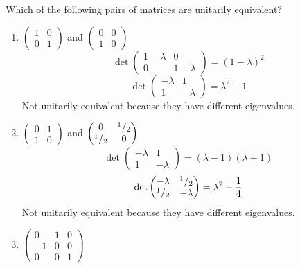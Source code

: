 Which of the following pairs of matrices are unitarily equivalent?
\begin{enumerate}
\item $\begin{pmatrix} 1& 0\\0 & 1\end{pmatrix}$ and $\begin{pmatrix}0
    & 0\\1 & 0\end{pmatrix}$
\begin{equation}
\det{\begin{pmatrix} 1-\lambda& 0\\0 & 1-\lambda\end{pmatrix}} = (1-\lambda)^2
\end{equation}
\begin{equation}
\det{\begin{pmatrix}-\lambda & 1\\1 & -\lambda\end{pmatrix}} =
\lambda^2 -1
\end{equation}
Not unitarily equivalent  because they have different eigenvalues.
\item $\begin{pmatrix}0 & 1\\1 & 0 \end{pmatrix}$ and
  $\begin{pmatrix}0 & ^{1}/_{2}\\ ^{1}/_{2} & 0 \end{pmatrix}$
\begin{equation}
\det{
\begin{pmatrix}
-\lambda & 1\\
1 & -\lambda
\end{pmatrix}
} = (\lambda-1)(\lambda +1)
\end{equation}
\begin{equation}
\det{
\begin{pmatrix}
-\lambda & ^{1}/_{2}\\
^{1}/_{2} & -\lambda
\end{pmatrix}} = \lambda^2 - \frac{1}{4}
\end{equation}
Not unitarily equivalent  because they have different eigenvalues.
\item$\begin{pmatrix} 0 & 1 & 0\\-1 & 0  & 0\\0 & 0 & 1\end{pmatrix}$

\end{enumerate}
